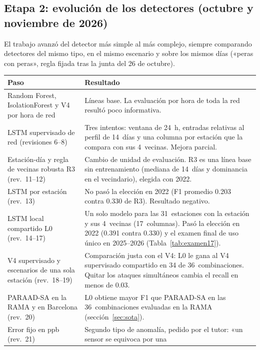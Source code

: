 \documentclass[11pt, letterpaper]{article}
\begin{document}
\subsection{Etapa 2: evolución de los detectores (octubre y noviembre de 2026)}
\label{sec:evolucion}

El trabajo avanzó del detector más simple al más complejo, siempre comparando detectores
del mismo tipo, en el mismo escenario y sobre los mismos días («peras con peras», regla
fijada tras la junta del 26 de octubre).

\begin{center}
\small
\renewcommand{\arraystretch}{1.25}
\begin{tabularx}{\linewidth}{@{}>{\raggedright\arraybackslash}p{5.4cm} Y@{}}
  \toprule
  \textbf{Paso} & \textbf{Resultado} \\
  \midrule
  Random Forest, IsolationForest y V4 por hora de red &
    Líneas base. La evaluación por hora de toda la red resultó poco informativa. \\
  LSTM supervisado de red (revisiones 6--8) &
    Tres intentos: ventana de 24~h, entradas relativas al perfil de 14~días y una columna
    por estación que la compara con sus 4~vecinas. Mejora parcial. \\
  Estación-día y regla de vecinas robusta R3 (rev.~11--12) &
    Cambio de unidad de evaluación. R3 es una línea base sin entrenamiento (mediana de
    14~días y dominancia en el vecindario), elegida con 2022. \\
  LSTM por estación (rev.~13) &
    No pasó la elección en 2022 (F1 promedio 0.203 contra 0.330 de R3). Resultado
    negativo. \\
  LSTM local compartido L0 (rev.~14--17) &
    Un solo modelo para las 31~estaciones con la estación y sus 4~vecinas (17~columnas).
    Pasó la elección en 2022 (0.391 contra 0.330) y el examen final de uso único en
    2025--2026 (Tabla~\ref{tab:examen17}). \\
  V4 supervisado y escenarios de una sola estación (rev.~18--19) &
    Comparación justa con el V4: L0 le gana al V4 supervisado compartido en 34 de
    36~combinaciones. Quitar los ataques simultáneos cambia el recall en menos de 0.03. \\
  PARAAD-SA en la RAMA y en Barcelona (rev.~20) &
    L0 obtiene mayor F1 que PARAAD-SA en las 36~combinaciones evaluadas en la RAMA
    (sección~\ref{sec:sota}). \\
  Error fijo en ppb (rev.~21) &
    Segundo tipo de anomalía, pedido por el tutor: «un sensor se equivoca por una

\end{tabularx}
\end{center}
\end{document}
